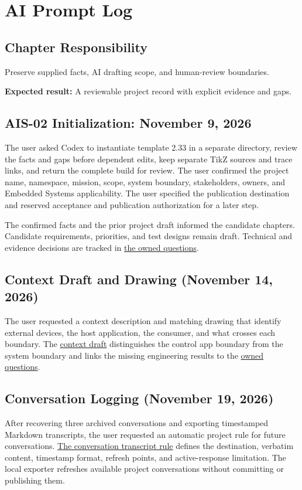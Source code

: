 \chapter{AI Prompt Log}
\section{Chapter Responsibility}
\label{Section:AIPromptLogResponsibility}
Preserve supplied facts, AI drafting scope, and human-review boundaries.

\noindent\textbf{Expected result:} A reviewable project record with explicit evidence and gaps.


\section{AIS-02 Initialization: November 9, 2026}
The user asked Codex to instantiate template 2.33 in a separate directory,
review the facts and gaps before dependent edits, keep separate TikZ sources
and trace links, and return the complete build for review. The user confirmed
the project name, namespace, mission, scope, system boundary, stakeholders,
owners, and Embedded Systems applicability. The user specified the
publication destination and reserved acceptance and publication authorization
for a later step.

The confirmed facts and the prior project draft informed the candidate
chapters. Candidate requirements, priorities, and test designs remain draft.
Technical and evidence decisions are tracked in
\hyperref[Table:OwnedQuestions]{the owned questions}.

\section{Context Draft and Drawing (November 14, 2026)}
The user requested a context description and matching drawing that identify
external devices, the host application, the consumer, and what crosses each
boundary. The \hyperref[Section:MeasurementMission]{context draft} distinguishes
the control app boundary from the system boundary and links the missing
engineering results to the \hyperref[Table:OwnedQuestions]{owned questions}.

\section{Conversation Logging (November 19, 2026)}
After recovering three archived conversations and exporting timestamped
Markdown transcripts, the user requested an automatic project rule for
future conversations. \hyperref[Rule:AIChatLogging]{The conversation
transcript rule} defines the destination, verbatim content, timestamp format,
refresh points, and active-response limitation. The local exporter refreshes
available project conversations without committing or publishing them.

